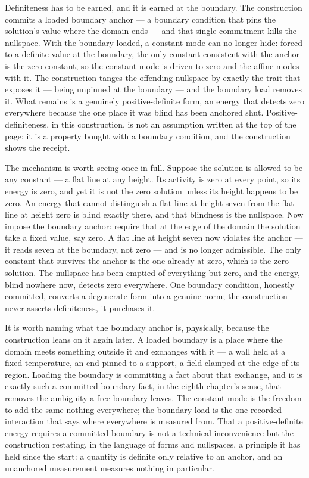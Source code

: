 Definiteness has to be earned, and it is earned at the boundary. The construction commits a loaded
boundary anchor --- a boundary condition that pins the solution's value where the domain ends --- and
that single commitment kills the nullspace. With the boundary loaded, a constant mode can no longer
hide: forced to a definite value at the boundary, the only constant consistent with the anchor is the
zero constant, so the constant mode is driven to zero and the affine modes with it. The construction
tanges the offending nullspace by exactly the trait that exposes it --- being unpinned at the boundary
--- and the boundary load removes it. What remains is a genuinely positive-definite form, an energy
that detects zero everywhere because the one place it was blind has been anchored shut. Positive-
definiteness, in this construction, is not an assumption written at the top of the page; it is a
property bought with a boundary condition, and the construction shows the receipt.

The mechanism is worth seeing once in full. Suppose the solution is allowed to be any constant --- a
flat line at any height. Its activity is zero at every point, so its energy is zero, and yet it is not
the zero solution unless its height happens to be zero. An energy that cannot distinguish a flat line at
height seven from the flat line at height zero is blind exactly there, and that blindness is the
nullspace. Now impose the boundary anchor: require that at the edge of the domain the solution take a
fixed value, say zero. A flat line at height seven now violates the anchor --- it reads seven at the
boundary, not zero --- and is no longer admissible. The only constant that survives the anchor is the
one already at zero, which is the zero solution. The nullspace has been emptied of everything but zero,
and the energy, blind nowhere now, detects zero everywhere. One boundary condition, honestly committed,
converts a degenerate form into a genuine norm; the construction never asserts definiteness, it
purchases it.

It is worth naming what the boundary anchor is, physically, because the construction leans on it again
later. A loaded boundary is a place where the domain meets something outside it and exchanges with it
--- a wall held at a fixed temperature, an end pinned to a support, a field clamped at the edge of its
region. Loading the boundary is committing a fact about that exchange, and it is exactly such a
committed boundary fact, in the eighth chapter's sense, that removes the ambiguity a free boundary
leaves. The constant mode is the freedom to add the same nothing everywhere; the boundary load is the
one recorded interaction that says where everywhere is measured from. That a positive-definite energy
requires a committed boundary is not a technical inconvenience but the construction restating, in the
language of forms and nullspaces, a principle it has held since the start: a quantity is definite only
relative to an anchor, and an unanchored measurement measures nothing in particular.

